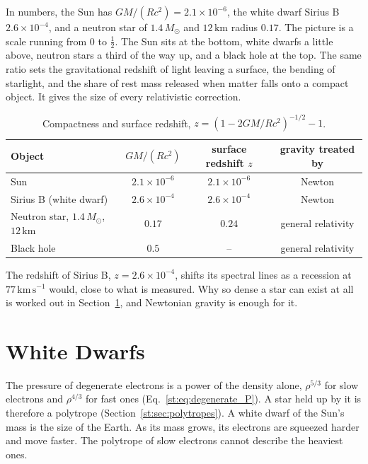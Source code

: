 In numbers, the Sun has $GM/(Rc^2)=2.1\times10^{-6}$, the white dwarf Sirius B $2.6\times10^{-4}$, and a neutron star of $1.4\,M_\odot$ and $12\,\mathrm{km}$ radius $0.17$. The picture is a scale running from $0$ to $\tfrac12$. The Sun sits at the bottom, white dwarfs a little above, neutron stars a third of the way up, and a black hole at the top. The same ratio sets the gravitational redshift of light leaving a surface, the bending of starlight, and the share of rest mass released when matter falls onto a compact object. It gives the size of every relativistic correction.

\begin{table}[htbp]
	\centering
	\begin{tabular}{@{}l c c c@{}}
		\toprule
		\textbf{Object} & $GM/(Rc^2)$ & \textbf{surface redshift} $z$ & \textbf{gravity treated by} \\
		\midrule
		Sun & $2.1\times10^{-6}$ & $2.1\times10^{-6}$ & Newton \\
		Sirius B (white dwarf) & $2.6\times10^{-4}$ & $2.6\times10^{-4}$ & Newton \\
		Neutron star, $1.4\,M_\odot$, $12\,\mathrm{km}$ & $0.17$ & $0.24$ & general relativity \\
		Black hole & $0.5$ & -- & general relativity \\
		\bottomrule
	\end{tabular}
	\caption{Compactness and surface redshift, $z=(1-2GM/Rc^2)^{-1/2}-1$.}
	\label{cs:tab:compactness}
\end{table}

The redshift of Sirius B, $z=2.6\times10^{-4}$, shifts its spectral lines as a recession at $77\,\mathrm{km\,s^{-1}}$ would, close to what is measured. Why so dense a star can exist at all is worked out in Section~\ref{cs:sec:wd}, and Newtonian gravity is enough for it.

\section{White Dwarfs}
\label{cs:sec:wd}

The pressure of degenerate electrons is a power of the density alone, $\rho^{5/3}$ for slow electrons and $\rho^{4/3}$ for fast ones (Eq.~\eqref{st:eq:degenerate_P}). A star held up by it is therefore a polytrope (Section~\ref{st:sec:polytropes}). A white dwarf of the Sun's mass is the size of the Earth. As its mass grows, its electrons are squeezed harder and move faster. The polytrope of slow electrons cannot describe the heaviest ones.

